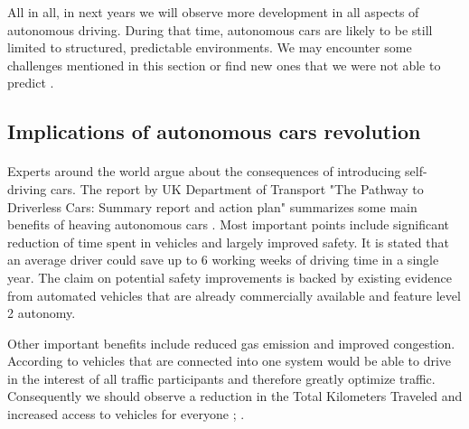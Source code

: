 \documentclass[11pt,english]{article}
\begin{document}
\par
All in all, in next years we will observe more development in all aspects of autonomous driving. 
During that time, autonomous cars are likely to be still limited to structured, predictable environments.
We may encounter some challenges mentioned in this section or find new ones that we were not able to predict \citep{luettel2012autonomous}.












\subsection{Implications of autonomous cars revolution}



\paragraph{}
Experts around the world argue about the consequences of introducing self-driving cars. The report by UK Department of Transport "The Pathway to Driverless Cars: Summary report and action plan" summarizes some main benefits of heaving autonomous cars \citep{pathwaytodriverless}. Most important points include significant reduction of time spent in vehicles and largely improved safety. It is stated that an average driver could save up to 6 working weeks of driving time in a single year. The claim on potential safety improvements is backed by existing evidence from automated vehicles that are already commercially available and feature level 2 autonomy. 
\par
Other important benefits include reduced gas emission and improved congestion. According to \citet{pathwaytodriverless} vehicles that are connected into one system would be able to drive in the interest of all traffic participants and therefore greatly optimize traffic. Consequently we should observe a reduction in the Total Kilometers Traveled and increased access to vehicles for everyone \citep{pathwaytodriverless} ; \citep{drivewave}.
\par
\end{document}

